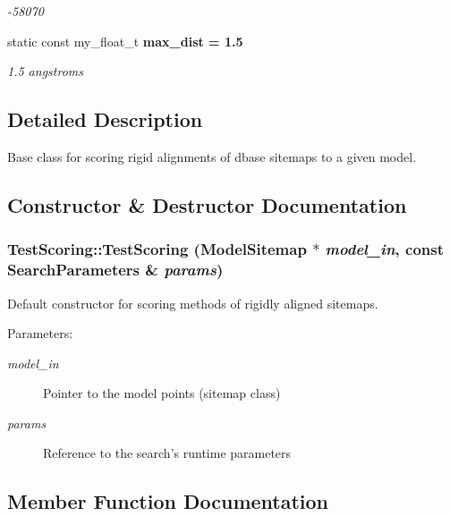 \begin{CompactItemize}
\begin{CompactList}\small\item\em -58070 \item\end{CompactList}\item 
static const my\_\-float\_\-t \bf{max\_\-dist} = 1.5\label{classASCbase_1_1TestScoring_46212ce7b93b0912702739bfd3efe04f}

\begin{CompactList}\small\item\em 1.5 angstroms \item\end{CompactList}\end{CompactItemize}


\subsection{Detailed Description}
Base class for scoring rigid alignments of dbase sitemaps to a given model. 



\subsection{Constructor \& Destructor Documentation}
\subsubsection{\setlength{\rightskip}{0pt plus 5cm}Test\-Scoring::Test\-Scoring (\bf{Model\-Sitemap} $\ast$ {\em model\_\-in}, const \bf{Search\-Parameters} \& {\em params})}\label{classASCbase_1_1TestScoring_30cc41f637641ce6dd0c225594e17e15}


Default constructor for scoring methods of rigidly aligned sitemaps. 

\begin{Desc}
\item[Parameters:]
\begin{description}
\item[{\em model\_\-in}]Pointer to the model points (sitemap class) \item[{\em params}]Reference to the search's runtime parameters \end{description}
\end{Desc}


\subsection{Member Function Documentation}
